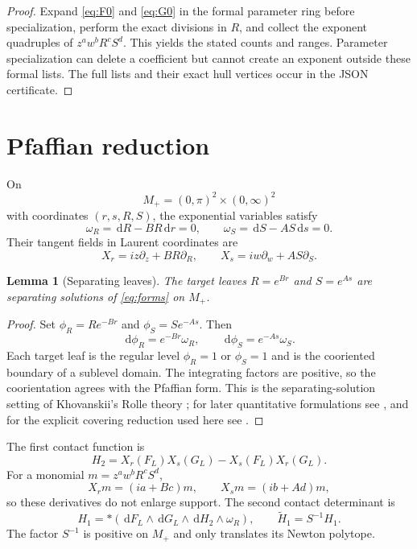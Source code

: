 \documentclass[11pt]{article}
\newtheorem{lemma}[theorem]{Lemma}
\newcommand{\dd}{\,\mathrm d}
\begin{document}
\begin{proof}
Expand \eqref{eq:F0} and \eqref{eq:G0} in the formal parameter ring before specialization, perform the exact divisions in $R$, and collect the exponent quadruples of $z^aw^bR^cS^d$.  This yields the stated counts and ranges.  Parameter specialization can delete a coefficient but cannot create an exponent outside these formal lists.  The full lists and their exact hull vertices occur in the JSON certificate.
\end{proof}

\section{Pfaffian reduction}\label{sec:pfaffian}

On
\[
 M_+=(0,\pi)^2\times(0,\infty)^2
\]
with coordinates $(r,s,R,S)$, the exponential variables satisfy
\begin{equation}\label{eq:forms}
 \omega_R=\dd R-BR\dd r=0,
 \qquad
 \omega_S=\dd S-AS\dd s=0.
\end{equation}
Their tangent fields in Laurent coordinates are
\begin{equation}\label{eq:euler-fields}
 X_r=iz\partial_z+BR\partial_R,
 \qquad
 X_s=iw\partial_w+AS\partial_S.
\end{equation}

\begin{lemma}[Separating leaves]\label{lem:separating}
The target leaves $R=e^{Br}$ and $S=e^{As}$ are separating solutions of \eqref{eq:forms} on $M_+$.
\end{lemma}

\begin{proof}
Set $\phi_R=Re^{-Br}$ and $\phi_S=Se^{-As}$.  Then
\[
 \dd\phi_R=e^{-Br}\omega_R,
 \qquad
 \dd\phi_S=e^{-As}\omega_S.
\]
Each target leaf is the regular level $\phi_R=1$ or $\phi_S=1$ and is the cooriented boundary of a sublevel domain.  The integrating factors are positive, so the coorientation agrees with the Pfaffian form.  This is the separating-solution setting of Khovanskii's Rolle theory \cite{Khovanskii1980}\cite[Chapter~3]{Khovanskii1991}; for later quantitative formulations see \cite{GabrielovVorobjov2004}, and for the explicit covering reduction used here see \cite{Kaloshin2003}.
\end{proof}

The first contact function is
\begin{equation}\label{eq:H2}
 H_2=X_r(F_L)X_s(G_L)-X_s(F_L)X_r(G_L).
\end{equation}
For a monomial $m=z^aw^bR^cS^d$,
\begin{equation}\label{eq:euler-monomial}
 X_rm=(ia+Bc)m,
 \qquad
 X_sm=(ib+Ad)m,
\end{equation}
so these derivatives do not enlarge support.  The second contact determinant is
\begin{equation}\label{eq:H1}
 H_1=*(\dd F_L\wedge\dd G_L\wedge\dd H_2\wedge\omega_R),
 \qquad \widetilde H_1=S^{-1}H_1.
\end{equation}
The factor $S^{-1}$ is positive on $M_+$ and only translates its Newton polytope.
\end{document}
